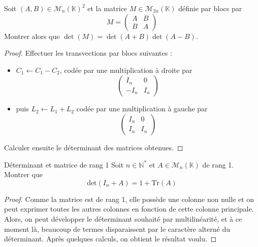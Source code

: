 \documentclass[french,a4paper]{article}
\newcommand{\N}{\mathbb{N}}
\newcommand{\K}{\mathbb{K}}
\newcommand{\st}{^*}
\newcommand{\Tr}{\text{Tr}}
\theoremstyle{plain}
\theoremstyle{definition}
\theoremstyle{remark}
\begin{document}
\begin{ex}{}
	Soit $(A,B)\in\mathcal{M}_n(\K)^2$ et la matrice $M\in\mathcal{M}_{2n}(\K)$ définie par blocs par $$M=\begin{pmatrix}
		A&B\\
		B&A
	\end{pmatrix}$$ Montrer alors que $\det(M)=\det(A+B)\det(A-B)$.
\end{ex}
\begin{proof}
	Effectuer les transvections par blocs suivantes :
	\begin{itemize}
		\item $C_1\leftarrow C_1-C_2$, codée par une multiplication à droite par $$\begin{pmatrix}
			I_n&0\\
			-I_n&I_n
		\end{pmatrix}$$
		\item puis $L_2\leftarrow L_1+L_2$ codée par une multiplication à gauche par $$\begin{pmatrix}
			I_n&0\\
			I_n&I_n
		\end{pmatrix}$$
	\end{itemize} Calculer ensuite le déterminant des matrices obtenues.
\end{proof}

\begin{ex}{Déterminant et matrice de rang 1}
	Soit $n \in \N\st$ et $A \in \mathcal{M}_n(\K)$ de rang 1. Montrer que $$\text{det}(I_n+A) = 1 + \Tr(A)$$
\end{ex}
\begin{proof}
	Comme la matrice est de rang 1, elle possède une colonne non nulle et on peut exprimer toutes les autres colonnes en fonction de cette colonne principale. Alors, on peut développer le déterminant souhaité par multilinéarité, et à ce moment là, beaucoup de termes disparaissent par le caractère alterné du déterminant. Après quelques calculs, on obtient le résultat voulu.
\end{proof}
\end{document}
